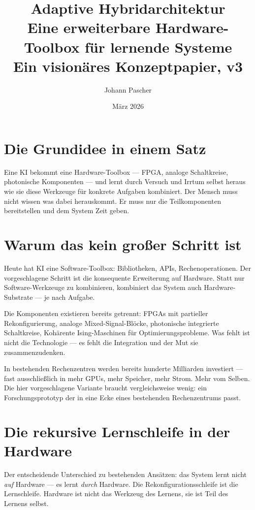 \documentclass[11pt]{report}
\title{\textbf{Adaptive Hybridarchitektur}\\
\large Eine erweiterbare Hardware-Toolbox für lernende Systeme\\
\normalsize Ein visionäres Konzeptpapier, v3}
\author{Johann Pascher}
\date{März 2026}
\begin{document}
\maketitle

\section{Die Grundidee in einem Satz}

Eine KI bekommt eine Hardware-Toolbox --- FPGA, analoge Schaltkreise, photonische Komponenten --- und lernt durch Versuch und Irrtum selbst heraus wie sie diese Werkzeuge für konkrete Aufgaben kombiniert. Der Mensch muss nicht wissen was dabei herauskommt. Er muss nur die Teilkomponenten bereitstellen und dem System Zeit geben.

\section{Warum das kein großer Schritt ist}

Heute hat KI eine Software-Toolbox: Bibliotheken, APIs, Rechenoperationen. Der vorgeschlagene Schritt ist die konsequente Erweiterung auf Hardware. Statt nur Software-Werkzeuge zu kombinieren, kombiniert das System auch Hardware-Substrate --- je nach Aufgabe.

Die Komponenten existieren bereits getrennt: FPGAs mit partieller Rekonfigurierung, analoge Mixed-Signal-Blöcke, photonische integrierte Schaltkreise, Kohärente Ising-Maschinen für Optimierungsprobleme. Was fehlt ist nicht die Technologie --- es fehlt die Integration und der Mut sie zusammenzudenken.

In bestehenden Rechenzentren werden bereits hunderte Milliarden investiert --- fast ausschließlich in mehr GPUs, mehr Speicher, mehr Strom. Mehr vom Selben. Die hier vorgeschlagene Variante braucht vergleichsweise wenig: ein Forschungsprototyp der in eine Ecke eines bestehenden Rechenzentrums passt.

\section{Die rekursive Lernschleife in der Hardware}

Der entscheidende Unterschied zu bestehenden Ansätzen: das System lernt nicht \textit{auf} Hardware --- es lernt \textit{durch} Hardware. Die Rekonfigurationsschleife ist die Lernschleife. Hardware ist nicht das Werkzeug des Lernens, sie ist Teil des Lernens selbst.
\end{document}
